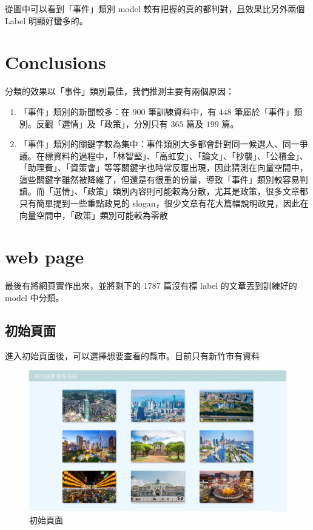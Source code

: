 \documentclass[12pt,cleanfoot,twocolumn]{asme2ej}
\begin{document}
從圖中可以看到「事件」類別 model 較有把握的真的都判對，且效果比另外兩個 Label 明顯好蠻多的。

\section{Conclusions}
分類的效果以「事件」類別最佳，我們推測主要有兩個原因：
\begin{enumerate}
        \item 「事件」類別的新聞較多：在 $900$ 筆訓練資料中，有 $448$ 筆屬於「事件」類別。反觀「選情」及「政策」，分別只有 $365$ 篇及 $199$ 篇。
        \item 「事件」類別的關鍵字較為集中：事件類別大多都會針對同一候選人、同一爭議。在標資料的過程中，「林智堅」、「高虹安」、「論文」、「抄襲」、「公積金」、「助理費」、「資策會」等等關鍵字也時常反覆出現，因此猜測在向量空間中，這些關鍵字雖然被降維了，但還是有很重的份量，導致「事件」類別較容易判讀。而「選情」、「政策」類別內容則可能較為分散，尤其是政策，很多文章都只有簡單提到一些重點政見的 slogan，很少文章有花大篇幅說明政見，因此在向量空間中，「政策」類別可能較為零散
\end{enumerate}


\section{web page}
最後有將網頁實作出來，並將剩下的 1787 篇沒有標 label 的文章丟到訓練好的 model 中分類。

\subsection{初始頁面}
進入初始頁面後，可以選擇想要查看的縣市。目前只有新竹市有資料
\begin{figure}[H]
        \includegraphics[scale=0.2]{start}
        \caption{初始頁面}
\end{figure}
\end{document}
